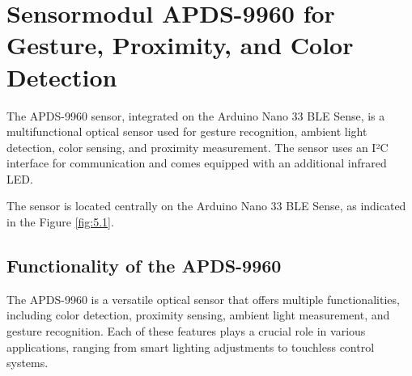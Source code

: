 %
%
%

\chapter{Sensormodul APDS-9960 for Gesture, Proximity, and Color Detection}

The APDS-9960 sensor, integrated on the Arduino Nano 33 BLE Sense, is a multifunctional optical sensor used for gesture recognition, ambient light detection, color sensing, and proximity measurement. The sensor uses an I²C interface for communication and comes equipped with an additional infrared LED.
\cite{Avago:2015}


\begin{center}    
	
	\label{fig:5.1}
\end{center}

\bigskip



The sensor is located centrally on the Arduino Nano 33 BLE Sense, as indicated in the Figure \ref{fig:5.1}.










\section{Functionality of the APDS-9960}


The APDS-9960 is a versatile optical sensor that offers multiple functionalities, including color detection, proximity sensing, ambient light measurement, and gesture recognition. Each of these features plays a crucial role in various applications, ranging from smart lighting adjustments to touchless control systems.

